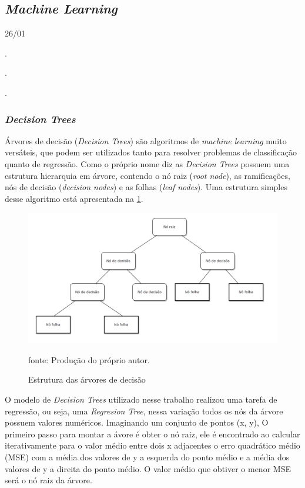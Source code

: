 \documentclass[
  12pt,		%
  a4paper,	%
  openright,%
  oneside,	%
  chapter=TITLE,		%
  section=TITLE,		%
  english,	%
  french,	%
  spanish,	%
  brazil	%
]{abntex2}
\begin{document}
    \subsection{\textit{Machine Learning}}
    26/01


    .

    .

    .

    \subsubsection{\textit{Decision Trees}}
    
    Árvores de decisão (\textit{Decision Trees}) são algoritmos de \textit{machine learning} muito versáteis, que podem ser utilizados
    tanto para resolver problemas de classificação quanto de regressão.
    Como o próprio nome diz as \textit{Decision Trees} possuem uma estrutura hierarquia em árvore, contendo o nó raiz (\textit{root node}),
    as ramificações, nós de decisão (\textit{decision nodes}) e as folhas (\textit{leaf nodes}). Uma estrutura simples desse algoritmo
    está apresentada na \ref*{estrutura_decision_tree}.

    \begin{figure}[h]
        \centering
        \caption{Estrutura das árvores de decisão}
        \includegraphics[width=16cm]{../reports/figures/decision_tree_exemple.png}
        \label{estrutura_decision_tree}
        \par
        {\small fonte: Produção do próprio autor.}
    \end{figure}

    O modelo de \textit{Decision Trees} utilizado nesse trabalho realizou uma tarefa de regressão, ou seja, uma \textit{Regresion Tree}, nessa variação 
    todos os nós da árvore possuem valores numéricos. Imaginando um conjunto de pontos (x, y), O primeiro passo para montar a ávore é obter o 
    nó raiz, ele é encontrado ao calcular iterativamente para o valor médio entre dois x adjacentes o erro quadrático médio (MSE) com a média
    dos valores de y a esquerda do ponto médio e a média dos valores de y a direita do ponto médio. O valor médio que obtiver o menor MSE
    será o nó raiz da árvore.
\end{document}
